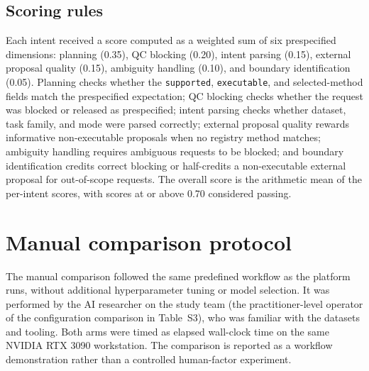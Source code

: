 \documentclass[11pt]{article}
\begin{document}
\subsection{Scoring rules}

Each intent received a score computed as a weighted sum of six prespecified dimensions: planning (0.35), QC blocking (0.20), intent parsing (0.15), external proposal quality (0.15), ambiguity handling (0.10), and boundary identification (0.05). Planning checks whether the \texttt{supported}, \texttt{executable}, and selected-method fields match the prespecified expectation; QC blocking checks whether the request was blocked or released as prespecified; intent parsing checks whether dataset, task family, and mode were parsed correctly; external proposal quality rewards informative non-executable proposals when no registry method matches; ambiguity handling requires ambiguous requests to be blocked; and boundary identification credits correct blocking or half-credits a non-executable external proposal for out-of-scope requests. The overall score is the arithmetic mean of the per-intent scores, with scores at or above 0.70 considered passing.

\section{Manual comparison protocol}

The manual comparison followed the same predefined workflow as the platform runs, without additional hyperparameter tuning or model selection. It was performed by the AI researcher on the study team (the practitioner-level operator of the configuration comparison in Table~S3), who was familiar with the datasets and tooling. Both arms were timed as elapsed wall-clock time on the same NVIDIA RTX 3090 workstation. The comparison is reported as a workflow demonstration rather than a controlled human-factor experiment.
\end{document}
